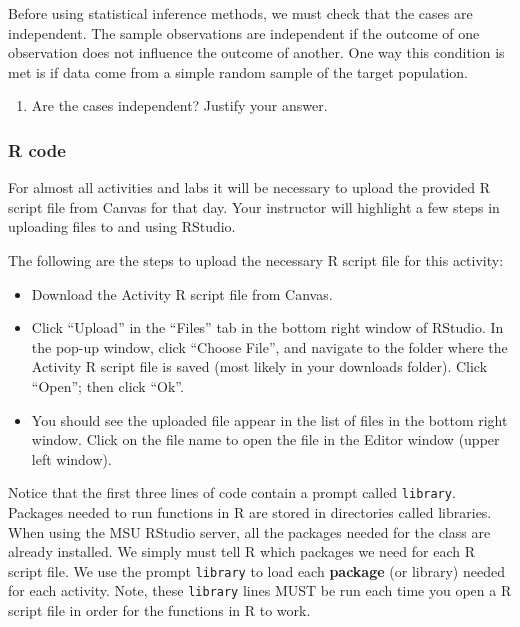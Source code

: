 \documentclass[
]{report}
\providecommand{\tightlist}{%
  \setlength{\itemsep}{0pt}\setlength{\parskip}{0pt}}
\begin{document}
Before using statistical inference methods, we must check that the cases are independent. The sample observations are independent if the outcome of one observation does not influence the outcome of another. One way this condition is met is if data come from a simple random sample of the target population.

\begin{enumerate}
\def\labelenumi{\arabic{enumi}.}
\tightlist
\item
  Are the cases independent? Justify your answer.
\end{enumerate}

\vspace{0.8in}

\subsubsection*{R code}\label{r-code}

For almost all activities and labs it will be necessary to upload the provided R script file from Canvas for that day. Your instructor will highlight a few steps in uploading files to and using RStudio.

The following are the steps to upload the necessary R script file for this activity:

\begin{itemize}
\item
  Download the Activity R script file from Canvas.
\item
  Click ``Upload'' in the ``Files'' tab in the bottom right window of RStudio. In the pop-up window, click ``Choose File'', and navigate to the folder where the Activity R script file is saved (most likely in your downloads folder). Click ``Open''; then click ``Ok''.
\item
  You should see the uploaded file appear in the list of files in the bottom right window. Click on the file name to open the file in the Editor window (upper left window).
\end{itemize}

Notice that the first three lines of code contain a prompt called \texttt{library}. Packages needed to run functions in R are stored in directories called libraries. When using the MSU RStudio server, all the packages needed for the class are already installed. We simply must tell R which packages we need for each R script file. We use the prompt \texttt{library} to load each \textbf{package} (or library) needed for each activity. Note, these \texttt{library} lines MUST be run each time you open a R script file in order for the functions in R to work.
\end{document}
